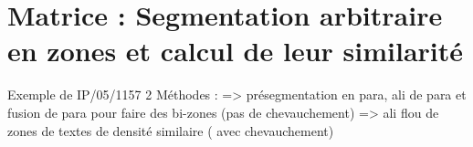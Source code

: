 \documentclass[10pt,a4paper,twoside]{article}
\begin{document}
\section{Matrice : Segmentation arbitraire en zones et calcul de leur similarité}
Exemple de IP/05/1157
2 Méthodes : 
=> présegmentation en para, ali de para et fusion de para pour faire des bi-zones (pas de chevauchement)
=> ali flou de zones de textes de densité similaire ( avec chevauchement)




% 

\renewcommand\refname{Références}



\end{document}
